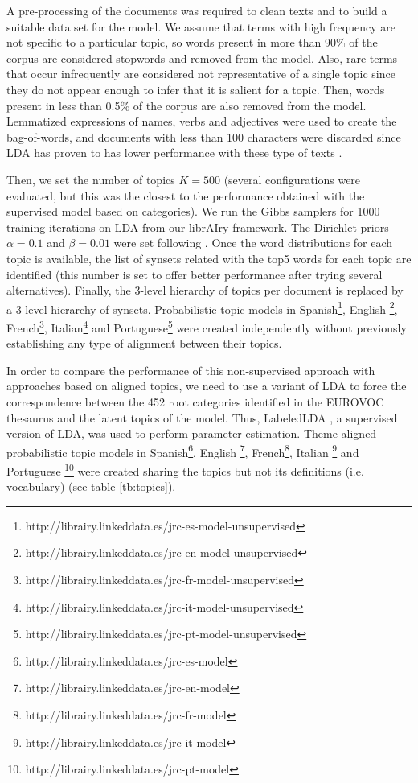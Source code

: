  A pre-processing of the documents was required to clean texts and to build a suitable data set for the model. We assume that terms with high frequency are not specific to a particular topic, so words present in more than 90\% of the corpus are considered stopwords and removed from the model. Also, rare terms that occur infrequently are considered not representative of a single topic since they do not appear enough to infer that it is salient for a topic. Then, words present in less than 0.5\% of the corpus are also removed from the model. Lemmatized expressions of names, verbs and adjectives were used to create the bag-of-words, and documents with less than 100 characters were discarded since LDA has proven to has lower performance with these type of texts \citep{Cheng2014a}. 
 
 Then, we set the number of topics $K=500$ (several configurations were evaluated, but this was the closest to the performance obtained with the supervised model based on categories). We run the Gibbs samplers for 1000 training iterations on LDA from our librAIry framework. The Dirichlet priors $\alpha=0.1$ and $\beta=0.01$ were set following \citep{Hu2014a}. Once the word distributions for each topic is available, the list of synsets related with the top5 words for each topic are identified (this number is set to offer better performance after trying several alternatives). Finally, the 3-level hierarchy of topics per document is replaced by a 3-level hierarchy of synsets. Probabilistic topic models in Spanish\footnote{http://librairy.linkeddata.es/jrc-es-model-unsupervised}, English \footnote{http://librairy.linkeddata.es/jrc-en-model-unsupervised}, French\footnote{http://librairy.linkeddata.es/jrc-fr-model-unsupervised}, Italian\footnote{http://librairy.linkeddata.es/jrc-it-model-unsupervised} and Portuguese\footnote{http://librairy.linkeddata.es/jrc-pt-model-unsupervised} were created independently without previously establishing any type of alignment between their topics.
 
 In order to compare the performance of this non-supervised approach with approaches based on aligned topics, we need to use a variant of LDA to force the correspondence between the 452 root categories identified in the EUROVOC thesaurus and the latent topics of the model. Thus, LabeledLDA \citep{Ramage2009a}, a supervised version of LDA, was used to perform parameter estimation. Theme-aligned probabilistic topic models in Spanish\footnote{http://librairy.linkeddata.es/jrc-es-model}, English \footnote{http://librairy.linkeddata.es/jrc-en-model}, French\footnote{http://librairy.linkeddata.es/jrc-fr-model}, Italian \footnote{http://librairy.linkeddata.es/jrc-it-model} and Portuguese \footnote{http://librairy.linkeddata.es/jrc-pt-model} were created sharing the topics but not its definitions (i.e. vocabulary) (see table \ref{tb:topics}).


